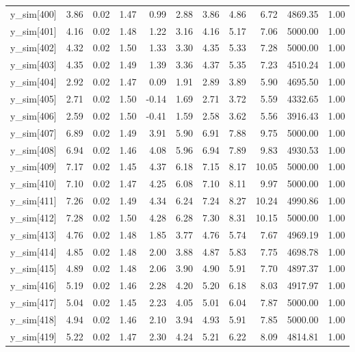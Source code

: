 \begin{table}[ht]
\begin{tabular}{rrrrrrrrrrr}
  y\_sim[400] & 3.86 & 0.02 & 1.47 & 0.99 & 2.88 & 3.86 & 4.86 & 6.72 & 4869.35 & 1.00 \\ 
  y\_sim[401] & 4.16 & 0.02 & 1.48 & 1.22 & 3.16 & 4.16 & 5.17 & 7.06 & 5000.00 & 1.00 \\ 
  y\_sim[402] & 4.32 & 0.02 & 1.50 & 1.33 & 3.30 & 4.35 & 5.33 & 7.28 & 5000.00 & 1.00 \\ 
  y\_sim[403] & 4.35 & 0.02 & 1.49 & 1.39 & 3.36 & 4.37 & 5.35 & 7.23 & 4510.24 & 1.00 \\ 
  y\_sim[404] & 2.92 & 0.02 & 1.47 & 0.09 & 1.91 & 2.89 & 3.89 & 5.90 & 4695.50 & 1.00 \\ 
  y\_sim[405] & 2.71 & 0.02 & 1.50 & -0.14 & 1.69 & 2.71 & 3.72 & 5.59 & 4332.65 & 1.00 \\ 
  y\_sim[406] & 2.59 & 0.02 & 1.50 & -0.41 & 1.59 & 2.58 & 3.62 & 5.56 & 3916.43 & 1.00 \\ 
  y\_sim[407] & 6.89 & 0.02 & 1.49 & 3.91 & 5.90 & 6.91 & 7.88 & 9.75 & 5000.00 & 1.00 \\ 
  y\_sim[408] & 6.94 & 0.02 & 1.46 & 4.08 & 5.96 & 6.94 & 7.89 & 9.83 & 4930.53 & 1.00 \\ 
  y\_sim[409] & 7.17 & 0.02 & 1.45 & 4.37 & 6.18 & 7.15 & 8.17 & 10.05 & 5000.00 & 1.00 \\ 
  y\_sim[410] & 7.10 & 0.02 & 1.47 & 4.25 & 6.08 & 7.10 & 8.11 & 9.97 & 5000.00 & 1.00 \\ 
  y\_sim[411] & 7.26 & 0.02 & 1.49 & 4.34 & 6.24 & 7.24 & 8.27 & 10.24 & 4990.86 & 1.00 \\ 
  y\_sim[412] & 7.28 & 0.02 & 1.50 & 4.28 & 6.28 & 7.30 & 8.31 & 10.15 & 5000.00 & 1.00 \\ 
  y\_sim[413] & 4.76 & 0.02 & 1.48 & 1.85 & 3.77 & 4.76 & 5.74 & 7.67 & 4969.19 & 1.00 \\ 
  y\_sim[414] & 4.85 & 0.02 & 1.48 & 2.00 & 3.88 & 4.87 & 5.83 & 7.75 & 4698.78 & 1.00 \\ 
  y\_sim[415] & 4.89 & 0.02 & 1.48 & 2.06 & 3.90 & 4.90 & 5.91 & 7.70 & 4897.37 & 1.00 \\ 
  y\_sim[416] & 5.19 & 0.02 & 1.46 & 2.28 & 4.20 & 5.20 & 6.18 & 8.03 & 4917.97 & 1.00 \\ 
  y\_sim[417] & 5.04 & 0.02 & 1.45 & 2.23 & 4.05 & 5.01 & 6.04 & 7.87 & 5000.00 & 1.00 \\ 
  y\_sim[418] & 4.94 & 0.02 & 1.46 & 2.10 & 3.94 & 4.93 & 5.91 & 7.85 & 5000.00 & 1.00 \\ 
  y\_sim[419] & 5.22 & 0.02 & 1.47 & 2.30 & 4.24 & 5.21 & 6.22 & 8.09 & 4814.81 & 1.00 \\ 

\end{tabular}
\end{table}
